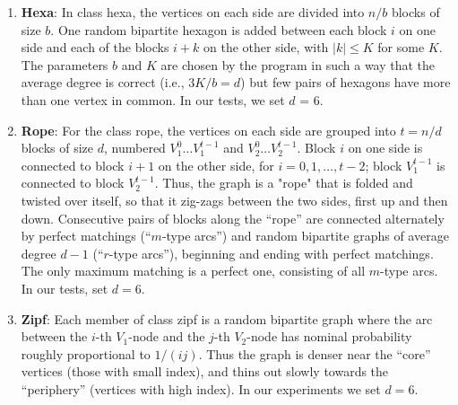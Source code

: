 \documentclass{article}
\begin{document}
\begin{enumerate}
\item {\bf Hexa}: In class {\sf hexa}, the vertices on each side are divided into $n/b$ blocks of size $b$. One random bipartite hexagon is added between each block $i$ on one side and each of the blocks $i + k$ on the other side, with $|k| \leq K$ for some $K$. The parameters $b$ and $K$ are chosen by the program in such a way that the average degree is correct (i.e., $3K/b = d$) but few pairs of hexagons have more than one vertex in common. In our tests, we set $d$ = 6.

\item {\bf Rope}: For the class {\sf rope}, the vertices on each side are grouped into $t = n/d$ blocks of size $d$, numbered $V_1^0 \ldots V_1^{t-1}$ and $V_2^0 \ldots V_2^{t-1}$. Block $i$ on one side is connected to block $i+1$ on the other side, for $i = 0, 1, \ldots, t-2$; block $V_1^{t-1}$ is connected to block $V_2^{t-1}$. Thus, the graph is a "rope" that is folded and twisted over itself, so that it zig-zags between the two sides, first up and then down. Consecutive
pairs of blocks along the ``rope'' are connected alternately by perfect matchings (``$m$-type arcs'') and random bipartite graphs of average degree $d-1$ (``$r$-type arcs''), beginning and ending with perfect matchings. The only maximum matching is a perfect one, consisting of all $m$-type arcs. In our tests, set $d=6$.

\item {\bf Zipf}: Each member of class {\sf zipf} is a random bipartite graph where the arc between the $i$-th $V_1$-node and the $j$-th $V_2$-node has nominal probability roughly proportional to $1/(ij)$. Thus the graph is denser near the ``core'' vertices (those with small index), and thins out slowly towards the ``periphery'' (vertices with high index). In our experiments we set $d = 6$.
\end{enumerate}
\end{document}
